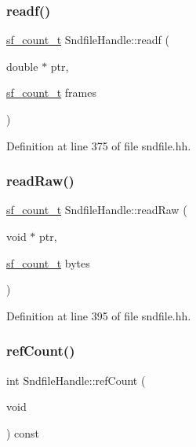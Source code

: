 \subsubsection{\texorpdfstring{readf()}{readf()}\hspace{0.1cm}{\footnotesize\ttfamily [4/4]}}
{\footnotesize\ttfamily \mbox{\hyperlink{sndfile_8h_af2b12fded74bc949f1f1f392a2af4892}{sf\+\_\+count\+\_\+t}} Sndfile\+Handle\+::readf (\begin{DoxyParamCaption}\item[{double $\ast$}]{ptr,  }\item[{\mbox{\hyperlink{sndfile_8h_af2b12fded74bc949f1f1f392a2af4892}{sf\+\_\+count\+\_\+t}}}]{frames }\end{DoxyParamCaption})\hspace{0.3cm}{\ttfamily [inline]}}



Definition at line 375 of file sndfile.\+hh.

\mbox{\label{class_sndfile_handle_a5dfeda9653d5c9c70552fb67f60d52c4}} 
\subsubsection{\texorpdfstring{readRaw()}{readRaw()}}
{\footnotesize\ttfamily \mbox{\hyperlink{sndfile_8h_af2b12fded74bc949f1f1f392a2af4892}{sf\+\_\+count\+\_\+t}} Sndfile\+Handle\+::read\+Raw (\begin{DoxyParamCaption}\item[{void $\ast$}]{ptr,  }\item[{\mbox{\hyperlink{sndfile_8h_af2b12fded74bc949f1f1f392a2af4892}{sf\+\_\+count\+\_\+t}}}]{bytes }\end{DoxyParamCaption})\hspace{0.3cm}{\ttfamily [inline]}}



Definition at line 395 of file sndfile.\+hh.

\mbox{\label{class_sndfile_handle_a6b56dc2dbe66af6b1fe44adf0f4f371a}} 
\subsubsection{\texorpdfstring{refCount()}{refCount()}}
{\footnotesize\ttfamily int Sndfile\+Handle\+::ref\+Count (\begin{DoxyParamCaption}\item[{void}]{ }\end{DoxyParamCaption}) const\hspace{0.3cm}{\ttfamily [inline]}}



